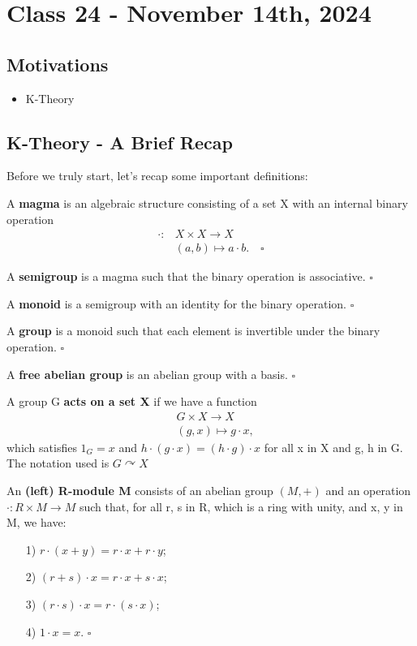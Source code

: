 \documentclass[../category_theory.tex]{subfiles}
\begin{document}
\section{Class 24 - November 14th, 2024}
\subsection{Motivations}
\begin{itemize}
	\item K-Theory
\end{itemize}
\subsection{K-Theory - A Brief Recap}
Before we truly start, let's recap some important definitions:
\begin{def*}
	A \textbf{magma} is an algebraic structure consisting of a set X with an internal binary operation
	\begin{align*}
		\cdot : & X\times X\rightarrow X                    \\
		        & (a, b)\longmapsto a \cdot b.\quad \square
	\end{align*}
\end{def*}
\begin{def*}
	A \textbf{semigroup} is a magma such that the binary operation is associative. \(\square\)
\end{def*}
\begin{def*}
	A \textbf{monoid} is a semigroup with an identity for the binary operation. \(\square\)
\end{def*}
\begin{def*}
	A \textbf{group} is a monoid such that each element is invertible under the binary operation. \(\square\)
\end{def*}
\begin{def*}
	A \textbf{free abelian group} is an abelian group with a basis. \(\square\)
\end{def*}
\begin{def*}
	A group G \textbf{acts on a set X} if we have a function
	\begin{align*}
		 & G \times X \rightarrow X \\
		 & (g, x)\mapsto g \cdot x,
	\end{align*}
	which satisfies \(1_{G}=x\) and \(h \cdot (g \cdot x)= (h \cdot g)\cdot x\) for all x in X and g, h in G. The notation used is \(G\curvearrowright X\)
\end{def*}
\begin{def*}
	An \textbf{(left) R-module M} consists of an abelian group \((M, +)\) and an operation \(\cdot :R\times M\rightarrow M\) such that, for all r, s in R, which is a ring with unity, and x, y in M, we have:
	\begin{itemize}
		\item[1)] \(r \cdot (x + y)= r \cdot x + r \cdot y\);
		\item[2)] \((r+s)\cdot x = r \cdot x + s \cdot x\);
		\item[3)] \((r \cdot s)\cdot x = r \cdot (s \cdot x)\);
		\item[4)] \(1 \cdot x = x\). \(\square\)
	\end{itemize}
\end{def*}
\end{document}
